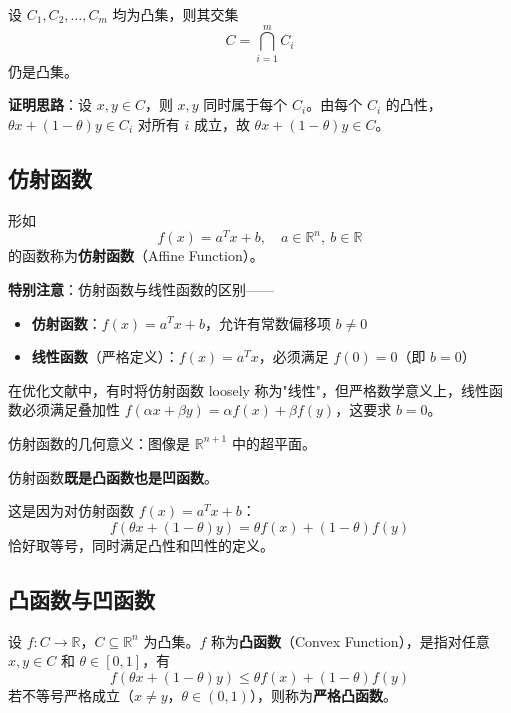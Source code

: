 \begin{property}[凸集的交集]
设 $C_1, C_2, \ldots, C_m$ 均为凸集，则其交集
\[
C = \bigcap_{i=1}^{m} C_i
\]
仍是凸集。

\textbf{证明思路}：设 $x, y \in C$，则 $x, y$ 同时属于每个 $C_i$。由每个 $C_i$ 的凸性，$\theta x + (1-\theta)y \in C_i$ 对所有 $i$ 成立，故 $\theta x + (1-\theta)y \in C$。
\end{property}

\subsection{仿射函数}

\begin{definition}[仿射函数与线性函数]
形如
\[
f(x) = a^T x + b, \quad a \in \mathbb{R}^n,\ b \in \mathbb{R}
\]
的函数称为\textbf{仿射函数}（Affine Function）。

\textbf{特别注意}：仿射函数与线性函数的区别——
\begin{itemize}
    \item \textbf{仿射函数}：$f(x) = a^T x + b$，允许有常数偏移项 $b \neq 0$
    \item \textbf{线性函数}（严格定义）：$f(x) = a^T x$，必须满足 $f(0) = 0$（即 $b = 0$）
\end{itemize}

在优化文献中，有时将仿射函数 loosely 称为"线性"，但严格数学意义上，线性函数必须满足叠加性 $f(\alpha x + \beta y) = \alpha f(x) + \beta f(y)$，这要求 $b = 0$。

仿射函数的几何意义：图像是 $\mathbb{R}^{n+1}$ 中的超平面。
\end{definition}

\begin{property}[仿射函数的关键性质]
仿射函数\textbf{既是凸函数也是凹函数}。

这是因为对仿射函数 $f(x) = a^T x + b$：
\[
f(\theta x + (1-\theta)y) = \theta f(x) + (1-\theta) f(y)
\]
恰好取等号，同时满足凸性和凹性的定义。
\end{property}

\subsection{凸函数与凹函数}

\begin{definition}[凸函数]
设 $f: C \to \mathbb{R}$，$C \subseteq \mathbb{R}^n$ 为凸集。$f$ 称为\textbf{凸函数}（Convex Function），是指对任意 $x, y \in C$ 和 $\theta \in [0,1]$，有
\[
f(\theta x + (1-\theta) y) \leq \theta f(x) + (1-\theta) f(y)
\]
若不等号严格成立（$x \neq y$，$\theta \in (0,1)$），则称为\textbf{严格凸函数}。
\end{definition}

